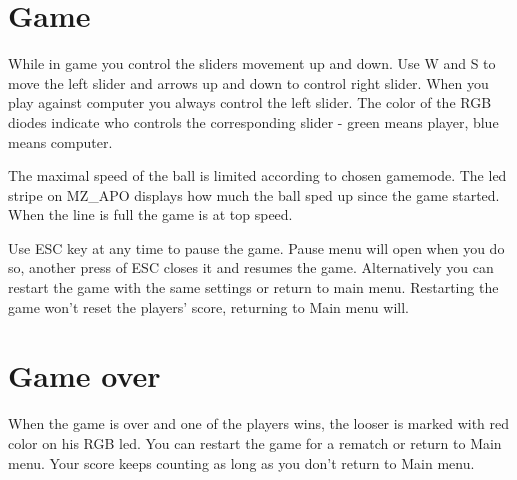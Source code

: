 \documentclass{article}
\begin{document}
\section{Game}
While in game you control the sliders movement up and down. Use W and S to move the left slider and arrows up and down to control right slider. When you play against computer you always control the left slider. The color of the RGB diodes indicate who controls the corresponding slider - green means player, blue means computer.
\par The maximal speed of the ball is limited according to chosen gamemode. The led stripe on MZ\_APO displays how much the ball sped up since the game started. When the line is full the game is at top speed.
\par Use ESC key at any time to pause the game. Pause menu will open when you do so, another press of ESC closes it and resumes the game. Alternatively you can restart the game with the same settings or return to main menu. Restarting the game won't reset the players' score, returning to Main menu will.

\section{Game over}
When the game is over and one of the players wins, the looser is marked with red color on his RGB led. You can restart the game for a rematch or return to Main menu. Your score keeps counting as long as you don't return to Main menu.
\end{document}
